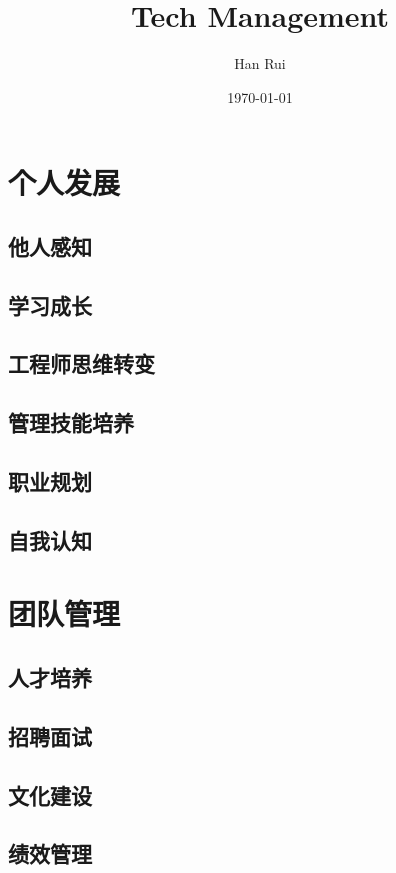 \documentclass[openany,10pt,UTF8]{ctexbook}
\title{Tech Management}
\author{Han Rui}
\date{\today}
\begin{document}
\maketitle
\tableofcontents

\part{个人发展}
\chapter{他人感知}

\chapter{学习成长}

\chapter{工程师思维转变}

\chapter{管理技能培养}

\chapter{职业规划}

\chapter{自我认知}


\part{团队管理}
\chapter{人才培养}

\chapter{招聘面试}

\chapter{文化建设}

\chapter{绩效管理}

\end{document}
